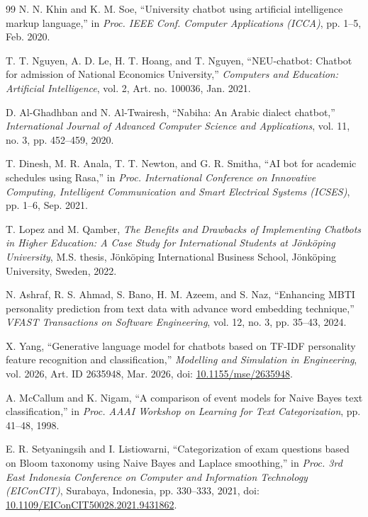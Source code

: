 \documentclass[12pt,a4paper]{article}
\begin{document}
\begin{thebibliography}{99}
N. N. Khin and K. M. Soe, ``University chatbot using artificial intelligence markup language,'' in \textit{Proc. IEEE Conf. Computer Applications (ICCA)}, pp. 1--5, Feb. 2020.

T. T. Nguyen, A. D. Le, H. T. Hoang, and T. Nguyen, ``NEU-chatbot: Chatbot for admission of National Economics University,'' \textit{Computers and Education: Artificial Intelligence}, vol. 2, Art. no. 100036, Jan. 2021.

D. Al-Ghadhban and N. Al-Twairesh, ``Nabiha: An Arabic dialect chatbot,'' \textit{International Journal of Advanced Computer Science and Applications}, vol. 11, no. 3, pp. 452--459, 2020.

T. Dinesh, M. R. Anala, T. T. Newton, and G. R. Smitha, ``AI bot for academic schedules using Rasa,'' in \textit{Proc. International Conference on Innovative Computing, Intelligent Communication and Smart Electrical Systems (ICSES)}, pp. 1--6, Sep. 2021.

T. Lopez and M. Qamber, \textit{The Benefits and Drawbacks of Implementing Chatbots in Higher Education: A Case Study for International Students at Jönköping University}, M.S. thesis, Jönköping International Business School, Jönköping University, Sweden, 2022.

N. Ashraf, R. S. Ahmad, S. Bano, H. M. Azeem, and S. Naz, ``Enhancing MBTI personality prediction from text data with advance word embedding technique,'' \textit{VFAST Transactions on Software Engineering}, vol. 12, no. 3, pp. 35--43, 2024.

X. Yang, ``Generative language model for chatbots based on TF-IDF personality feature recognition and classification,'' \textit{Modelling and Simulation in Engineering}, vol. 2026, Art. ID 2635948, Mar. 2026, doi: \href{https://doi.org/10.1155/mse/2635948}{10.1155/mse/2635948}.

A. McCallum and K. Nigam, ``A comparison of event models for Naive Bayes text classification,'' in \textit{Proc. AAAI Workshop on Learning for Text Categorization}, pp. 41--48, 1998.

E. R. Setyaningsih and I. Listiowarni, ``Categorization of exam questions based on Bloom taxonomy using Naive Bayes and Laplace smoothing,'' in \textit{Proc. 3rd East Indonesia Conference on Computer and Information Technology (EIConCIT)}, Surabaya, Indonesia, pp. 330--333, 2021, doi: \href{https://doi.org/10.1109/EIConCIT50028.2021.9431862}{10.1109/EIConCIT50028.2021.9431862}.


\end{thebibliography}
\end{document}
